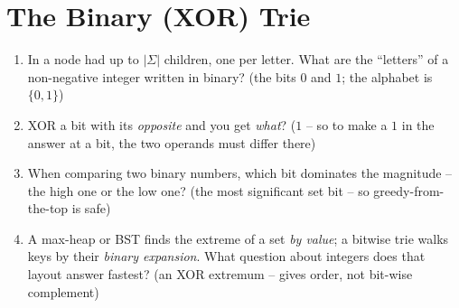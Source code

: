 \section{The Binary (XOR) Trie}\label{sec:c08-binary}

\begin{previouslybox}
\begin{enumerate}[nosep, leftmargin=1.6em]
  \item In  a node had up to $|\Sigma|$ children, one per letter. What are the
        ``letters'' of a non-negative integer written in binary? (the bits $0$ and $1$; the alphabet is
        $\{0,1\}$)
  \item XOR a bit with its \emph{opposite} and you get \emph{what}? ($1$ -- so to make a $1$ in the answer
        at a bit, the two operands must differ there)
  \item When comparing two binary numbers, which bit dominates the magnitude -- the high one or the low
        one? (the most significant set bit -- so greedy-from-the-top is safe)
  \item A max-heap or BST finds the extreme of a set \emph{by value}; a bitwise trie walks keys by their
        \emph{binary expansion}. What question about integers does that layout answer fastest? (an XOR
        extremum --  gives order, not bit-wise complement)
\end{enumerate}
\end{previouslybox}

